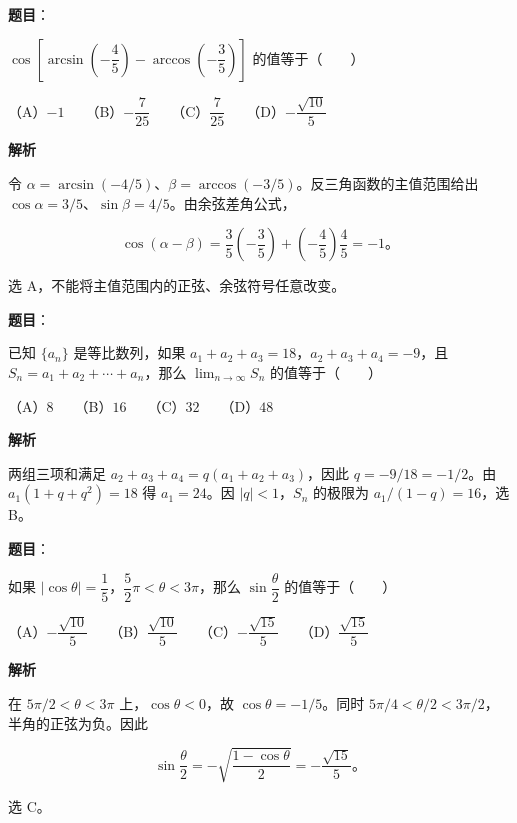 \begin{answer}

\textbf{题目}：

$\cos\left[\arcsin\left(-\dfrac45\right)-\arccos\left(-\dfrac35\right)\right]$ 的值等于\mbox{（　　）}

（A）$-1$　　（B）$-\dfrac7{25}$　　（C）$\dfrac7{25}$　　（D）$-\dfrac{\sqrt{10}}5$

\textbf{解析}

令 $\alpha=\arcsin(-4/5)$、$\beta=\arccos(-3/5)$。反三角函数的主值范围给出 $\cos\alpha=3/5$、$\sin\beta=4/5$。由余弦差角公式，

\nopagebreak[4]
\[
\cos(\alpha-\beta)=\frac35\left(-\frac35\right)+\left(-\frac45\right)\frac45=-1\text{。}
\]

选 A，不能将主值范围内的正弦、余弦符号任意改变。


\end{answer}
\begin{answer}

\textbf{题目}：

已知 $\{a_n\}$ 是等比数列，如果 $a_1+a_2+a_3=18$，$a_2+a_3+a_4=-9$，且 $S_n=a_1+a_2+\cdots+a_n$，那么 $\displaystyle\lim_{n\to\infty}S_n$ 的值等于\mbox{（　　）}

（A）$8$　　（B）$16$　　（C）$32$　　（D）$48$

\textbf{解析}

两组三项和满足 $a_2+a_3+a_4=q(a_1+a_2+a_3)$，因此 $q=-9/18=-1/2$。由 $a_1(1+q+q^2)=18$ 得 $a_1=24$。因 $|q|<1$，$S_n$ 的极限为 $a_1/(1-q)=16$，选 B。


\end{answer}
\begin{answer}

\textbf{题目}：

如果 $|\cos\theta|=\dfrac15$，$\dfrac52\pi<\theta<3\pi$，那么 $\sin\dfrac\theta2$ 的值等于\mbox{（　　）}

（A）$-\dfrac{\sqrt{10}}5$　　（B）$\dfrac{\sqrt{10}}5$　　（C）$-\dfrac{\sqrt{15}}5$　　（D）$\dfrac{\sqrt{15}}5$

\textbf{解析}

在 $5\pi/2<\theta<3\pi$ 上，$\cos\theta<0$，故 $\cos\theta=-1/5$。同时 $5\pi/4<\theta/2<3\pi/2$，半角的正弦为负。因此

\nopagebreak[4]
\[
\sin\frac\theta2=-\sqrt{\frac{1-\cos\theta}{2}}=-\frac{\sqrt{15}}5\text{。}
\]

选 C。


\end{answer}
